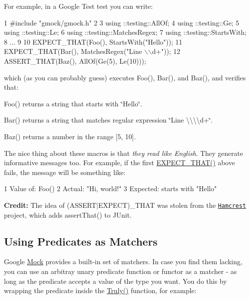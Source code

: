 For example, in a Google Test test you can write\+:


\begin{DoxyCode}
1 #include "gmock/gmock.h"
2 
3 using ::testing::AllOf;
4 using ::testing::Ge;
5 using ::testing::Le;
6 using ::testing::MatchesRegex;
7 using ::testing::StartsWith;
8 ...
9 
10   EXPECT\_THAT(Foo(), StartsWith("Hello"));
11   EXPECT\_THAT(Bar(), MatchesRegex("Line \(\backslash\)\(\backslash\)d+"));
12   ASSERT\_THAT(Baz(), AllOf(Ge(5), Le(10)));
\end{DoxyCode}


which (as you can probably guess) executes {\ttfamily Foo()}, {\ttfamily Bar()}, and {\ttfamily Baz()}, and verifies that\+:


\begin{DoxyItemize}
\item {\ttfamily Foo()} returns a string that starts with {\ttfamily \char`\"{}\+Hello\char`\"{}}.
\item {\ttfamily Bar()} returns a string that matches regular expression {\ttfamily \char`\"{}\+Line \textbackslash{}\textbackslash{}\textbackslash{}\textbackslash{}d+\char`\"{}}.
\item {\ttfamily Baz()} returns a number in the range \mbox{[}5, 10\mbox{]}.
\end{DoxyItemize}

The nice thing about these macros is that {\itshape they read like English}. They generate informative messages too. For example, if the first {\ttfamily \hyperlink{gmock-matchers_8h_ac31e206123aa702e1152bb2735b31409}{E\+X\+P\+E\+C\+T\+\_\+\+T\+H\+A\+T()}} above fails, the message will be something like\+:


\begin{DoxyCode}
1 Value of: Foo()
2   Actual: "Hi, world!"
3 Expected: starts with "Hello"
\end{DoxyCode}


{\bfseries Credit\+:} The idea of {\ttfamily (A\+S\+S\+E\+R\+T$\vert$\+E\+X\+P\+E\+CT)\+\_\+\+T\+H\+AT} was stolen from the \href{http://code.google.com/p/hamcrest/}{\tt Hamcrest} project, which adds {\ttfamily assert\+That()} to J\+Unit.

\subsection*{Using Predicates as Matchers}

Google \hyperlink{classMock}{Mock} provides a built-\/in set of matchers. In case you find them lacking, you can use an arbitray unary predicate function or functor as a matcher -\/ as long as the predicate accepts a value of the type you want. You do this by wrapping the predicate inside the {\ttfamily \hyperlink{namespacetesting_a5faf05cfaae6074439960048e478b1c8}{Truly()}} function, for example\+:



